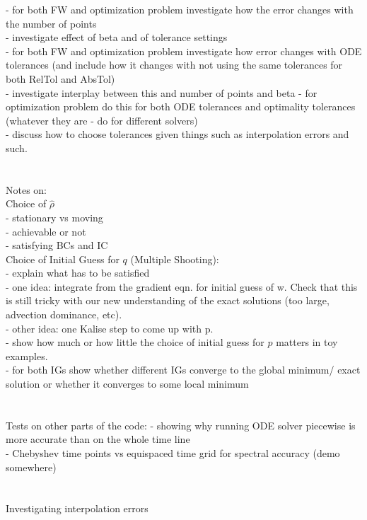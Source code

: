 \documentclass[11pt, a4paper]{article}
\theoremstyle{definition}
\newcommand{\adj}{q}
\begin{document}
- for both FW and optimization problem investigate how the error changes with the number of points\\
- investigate effect of beta and of tolerance settings\\

- for both FW and optimization problem investigate how error changes with ODE tolerances (and include how it changes with not using the same tolerances for both RelTol and AbsTol)\\
- investigate interplay between this and number of points and beta
- for optimization problem do this for both ODE tolerances and optimality tolerances (whatever they are - do for different solvers)\\
- discuss how to choose tolerances given things such as interpolation errors and such.\\
\\
\\
Notes on:\\
Choice of $\hat \rho$\\
- stationary vs moving\\
- achievable or not\\
- satisfying BCs and IC\\
Choice of Initial Guess for $\adj$ (Multiple Shooting):\\
- explain what has to be satisfied\\
- one idea: integrate from the gradient eqn. for initial guess of w. Check that this is still tricky with our new understanding of the exact solutions (too large, advection dominance, etc). \\
- other idea: one Kalise step to come up with p.\\
- show how much or how little the choice of initial guess for $p$ matters in toy examples.\\
- for both IGs show whether different IGs converge to the global minimum/ exact solution or whether it converges to some local minimum\\
\\
\\
Tests on other parts of the code:
- showing why running ODE solver piecewise is more accurate than on the whole time line\\
- Chebyshev time points vs equispaced time grid for spectral accuracy (demo somewhere)\\
\\
\\
Investigating interpolation errors\\
\end{document}
